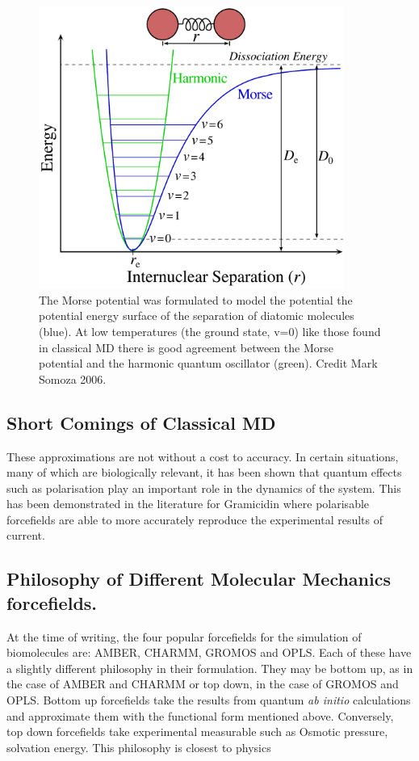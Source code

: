 \begin{figure}
	\centering
	\includegraphics[width=10cm]{figures/Morse-Potential.png}
	\caption[The Morse Potential Compared to a Harmonic Potential]{
		The Morse potential was formulated to model the potential the potential energy surface of the separation of diatomic molecules (blue). At low temperatures (the ground state, v=0) like those found in classical MD there is good agreement between the Morse potential and the harmonic quantum oscillator (green). Credit Mark Somoza 2006. 
}
	\label{morse_potential}
\end{figure}


\subsection{Short Comings of Classical MD}
These approximations are not without a cost to accuracy. In certain situations, many of which are biologically relevant, it has been shown that quantum effects such as polarisation play an important role in the dynamics of the system. This has been demonstrated in the literature for Gramicidin where polarisable forcefields are able to more accurately reproduce the experimental results of current.

\subsection{Philosophy of Different Molecular Mechanics forcefields.}
At the time of writing, the four popular forcefields for the simulation of biomolecules are: AMBER, CHARMM, GROMOS and OPLS. Each of these have a slightly different philosophy in their formulation. They may be bottom up, as in the case of AMBER and CHARMM or top down, in the case of GROMOS and OPLS. Bottom up forcefields take the results from quantum \textit{ab initio} calculations and approximate them with the functional form mentioned above. Conversely, top down forcefields take experimental measurable such as Osmotic pressure, solvation energy. This philosophy is closest to physics 

